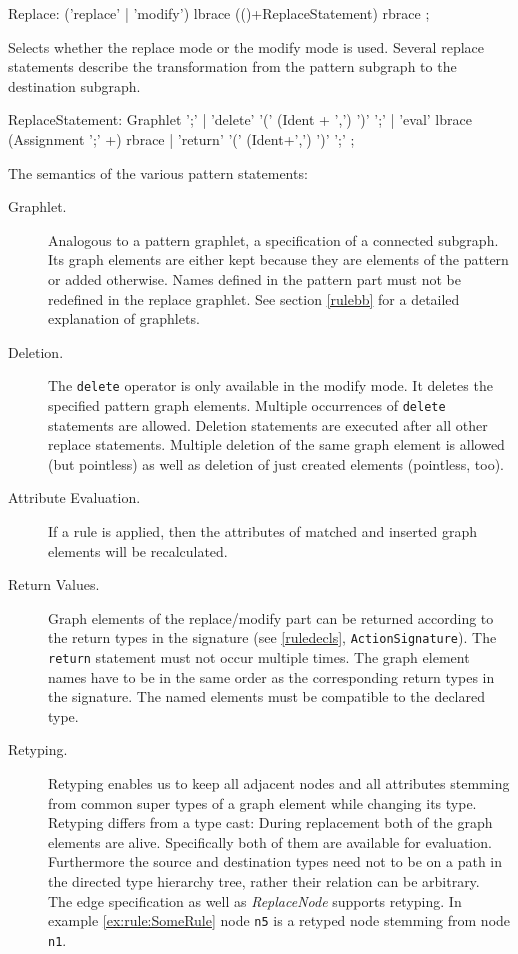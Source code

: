 \begin{rail}
  Replace: ('replace' | 'modify') lbrace (()+ReplaceStatement) rbrace ;
\end{rail}
Selects whether the replace mode or the modify mode is used. Several replace statements describe the transformation from the pattern subgraph to the destination subgraph.

\begin{rail}  
  ReplaceStatement: Graphlet ';' |
    'delete' '(' (Ident + ',') ')' ';' |
    'eval' lbrace (Assignment ';' +) rbrace |
    'return' '(' (Ident+',') ')' ';' ;
\end{rail}    
The semantics of the various pattern statements:
\begin{description}
  \item[Graphlet.] Analogous to a pattern graphlet, a specification of a connected subgraph. Its graph elements are either kept because they are elements of the pattern or added otherwise. Names defined in the pattern part must not be redefined in the replace graphlet. See section \ref{rulebb} for a detailed explanation of graphlets. 
  \item[Deletion.] The \texttt{delete} operator is only available in the modify mode. It deletes the specified pattern graph elements. Multiple occurrences of \texttt{delete} statements are allowed. Deletion statements are executed after all other replace statements. Multiple deletion of the same graph element is allowed (but pointless) as well as deletion of just created elements (pointless, too).
  \item[Attribute Evaluation.] If a rule is applied, then the attributes of matched and inserted graph elements will be recalculated.
  \item[Return Values.] Graph elements of the replace/modify part can be returned according to the return types in the signature (see \ref{ruledecls}, \texttt{ActionSignature}). The \texttt{return} statement must not occur multiple times. The graph element names have to be in the same order as the corresponding return types in the signature. The named elements must be compatible to the declared type.
  \item[Retyping.] Retyping enables us to keep all adjacent nodes and all attributes stemming from common super types of a graph element while changing its type. Retyping differs from a type cast: During replacement both of the graph elements are alive. Specifically both of them are available for evaluation. Furthermore the source and destination types need not to be on a path in the directed type hierarchy tree, rather their relation can be arbitrary.\\
The edge specification as well as \emph{ReplaceNode} supports retyping. In example \ref{ex:rule:SomeRule} node \texttt{n5} is a retyped node stemming from node \texttt{n1}.
\end{description} 


